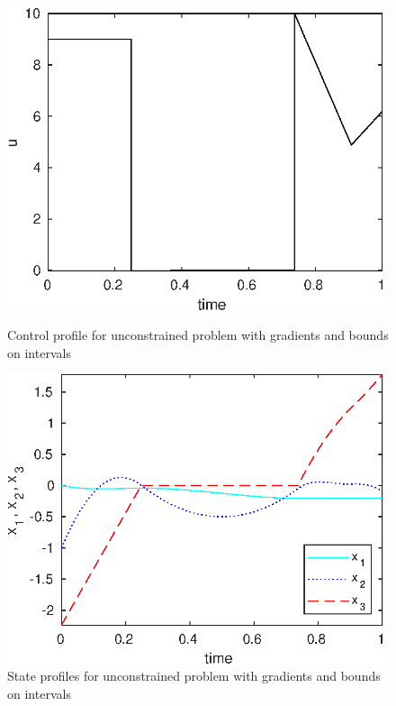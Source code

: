 \begin{figure}[htb]
\begin{minipage}[t]{0.5\linewidth}
\centering
\includegraphics[width=0.99\textwidth]{examples/problem2_bdu/graphs/u_624bdu.eps}
\caption[Tutorial example 3: control profile]{Control profile for
  unconstrained problem with gradients and bounds on intervals} \label{fig:prob2bdu_u} 
\end{minipage}
\begin{minipage}[t]{0.5\linewidth}
\centering
\includegraphics[width=0.99\textwidth]{examples/problem2_bdu/graphs/x13_624bdu.eps}
\caption[Tutorial example 3: state profiles]{State profiles for
  unconstrained problem with gradients and bounds on intervals} \label{fig:prob2bdu_x}
\end{minipage}
\end{figure}

